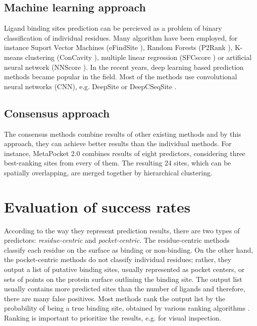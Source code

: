 \subsection{Machine learning approach}
Ligand binding sites prediction can be percieved as a problem of binary classification of individual residues. Many algorithm have been employed, for instance Suport Vector Machines (eFindSite \cite{efindsite}), Random Forests (P2Rank \cite{p2rank1}), K-means clustering (ConCavity \cite{concavity}), multiple linear regression (SFCscore \cite{sfcscore}) or artificial neural network (NNScore \cite{nnscore}). In the recent years, deep learning based prediction methods became popular in the field. Most of the methods use convolutional neural networks (CNN), e.g. DeepSite \cite{deepsite} or DeepCSeqSite \cite{deepcseqsite}.

\subsection{Consensus approach}
The consensus methods combine results of other existing methods and by this approach, they can achieve better results than the individual methods. For instance, MetaPocket 2.0 \cite{metapocket} combines results of eight predictors, considering three best-ranking sites from every of them. The resulting 24 sites, which can be spatially overlapping, are merged together by hierarchical clustering.


\section{Evaluation of success rates} \label{s:metrics}

According to the way they represent prediction results, there are two types of predictors: \textit{residue-centric} and \textit{pocket-centric}. The residue-centric methods classify each residue on the surface as binding or non-binding. On the other hand, the pocket-centric methods do not classify individual residues; rather, they output a list of putative binding sites, usually represented as pocket centers, or sets of points on the protein surface outlining the binding site. The output list usually contains more predicted sites than the number of ligands and therefore, there are many false positives. Most methods rank the output list by the probability of being a true binding site, obtained by various ranking algorithms \cite{p2rank1}. Ranking is important to prioritize the results, e.g. for visual inspection.

